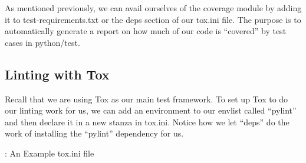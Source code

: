 \justifying
As mentioned previously, we can avail ourselves of the coverage module by adding it to test-requirements.txt or
the deps section of our tox.ini file. The purpose is to automatically generate a report on how much of our code
is ``covered'' by test cases in python/test.

\subsection{Linting with Tox}

Recall that we are using Tox as our main test framework. To set up Tox
to do our linting work for us, we can add an environment to our envlist
called ``pylint'' and then declare it in a new stanza in tox.ini. Notice
how we let ``deps'' do the work of installing the ``pylint'' dependency for
us.

\begin{mybox}{\thetcbcounter: An Example tox.ini file}
    
\end{mybox}
